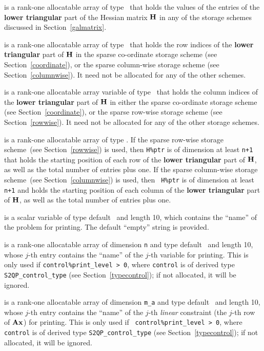 \documentclass{galahad}
\newcommand{\packagename}{S2QP}
\begin{document}
\begin{description}
\begin{description}
 is a rank-one allocatable array of type \realdp\ that holds
the values of the entries of the {\bf lower triangular} part
of the Hessian matrix ${\mathbf{H}}$ in any of the 
storage schemes discussed in Section~\ref{galmatrix}.

 is a rank-one allocatable array of type \integer\
that holds the row indices of the {\bf lower triangular} part of
${\mathbf{H}}$ in the sparse co-ordinate storage scheme (see
Section~\ref{coordinate}), or the sparse column-wise storage scheme
(see Section~\ref{columnwise}).  It need not be allocated for any of
the other schemes.

 is a rank-one allocatable array variable of type \integer\
that holds the column indices of the {\bf lower triangular} part of 
${\mathbf{H}}$ in either the sparse co-ordinate storage scheme 
(see Section~\ref{coordinate}), or the sparse row-wise 
storage scheme (see Section~\ref{rowwise}).
It need not be allocated for any of the other storage schemes.

 is a rank-one allocatable array of type \integer.
If the sparse row-wise storage scheme~(see Section~\ref{rowwise}) is
used, then {\tt H\%ptr} is of dimension at least {\tt n+1} that holds the starting position
of each row of the {\bf lower triangular} part of ${\mathbf{H}}$, as well as
the total number of entries plus one.  If the sparse column-wise
storage scheme~(see Section~\ref{columnwise}) is used, then {\tt
  H\%ptr} is of dimension at least {\tt n+1} and holds the starting position of each column
of the {\bf lower triangular} part of ${\mathbf{H}}$, as well as the total
number of entries plus one.

\end{description}

 is a scalar variable of type 
default \character\ and length 10, which contains the
``name'' of the problem for printing. The default ``empty'' string is
provided.

 is a rank-one allocatable array of dimension {\tt n} and type 
default \character\ and length 10, whose $j$-th entry contains the
``name'' of the $j$-th variable for printing. This is only used 
if {\tt control\%print\_level > 0}, where {\tt control} is of derived
type {\tt \packagename\_control\_type} (see
Section~\ref{typecontrol}); if not allocated, it will be ignored.

\itt{ANAMES} is a rank-one allocatable array of dimension {\tt m\_a}
and type default \character\ and length 10, whose $j$-th entry
contains the ``name'' of the $j$-th {\em linear} constraint (the
$j$-th row of ${\mathbf{A}}{\mathbf{x}}$) for printing.  This is only used if {\tt
  control\%print\_level > 0}, where {\tt control} is of derived type
{\tt \packagename\_control\_type} (see Section~\ref{typecontrol}); if
not allocated, it will be ignored.


\end{description}
\end{document}
